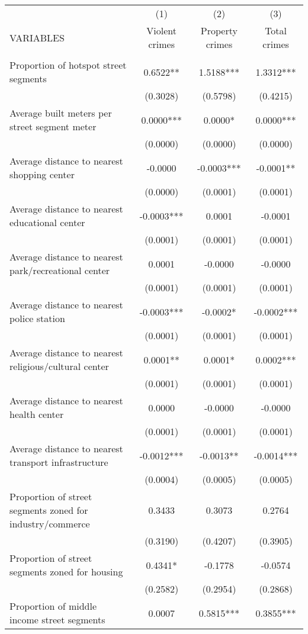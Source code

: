 \documentclass[]{article}
\begin{document}
\begin{tabular}{lccc} \hline
 & (1) & (2) & (3) \\
VARIABLES & Violent crimes & Property crimes & Total crimes \\ \hline
 &  &  &  \\
Proportion of hotspot street segments & 0.6522** & 1.5188*** & 1.3312*** \\
 & (0.3028) & (0.5798) & (0.4215) \\
Average built meters per street segment meter & 0.0000*** & 0.0000* & 0.0000*** \\
 & (0.0000) & (0.0000) & (0.0000) \\
Average distance to nearest shopping center & -0.0000 & -0.0003*** & -0.0001** \\
 & (0.0000) & (0.0001) & (0.0001) \\
Average distance to nearest educational center & -0.0003*** & 0.0001 & -0.0001 \\
 & (0.0001) & (0.0001) & (0.0001) \\
Average distance to nearest park/recreational center & 0.0001 & -0.0000 & -0.0000 \\
 & (0.0001) & (0.0001) & (0.0001) \\
Average distance to nearest police station & -0.0003*** & -0.0002* & -0.0002*** \\
 & (0.0001) & (0.0001) & (0.0001) \\
Average distance to nearest religious/cultural center & 0.0001** & 0.0001* & 0.0002*** \\
 & (0.0001) & (0.0001) & (0.0001) \\
Average distance to nearest health center & 0.0000 & -0.0000 & -0.0000 \\
 & (0.0001) & (0.0001) & (0.0001) \\
Average distance to nearest transport infrastructure & -0.0012*** & -0.0013** & -0.0014*** \\
 & (0.0004) & (0.0005) & (0.0005) \\
Proportion of street segments zoned for industry/commerce & 0.3433 & 0.3073 & 0.2764 \\
 & (0.3190) & (0.4207) & (0.3905) \\
Proportion of street segments zoned for housing & 0.4341* & -0.1778 & -0.0574 \\
 & (0.2582) & (0.2954) & (0.2868) \\
Proportion of middle income street segments & 0.0007 & 0.5815*** & 0.3855*** \\

\end{tabular}
\end{document}
